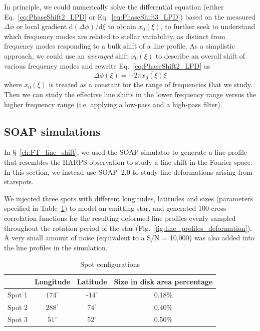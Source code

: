 In principle, we could numerically solve the differential equation (either Eq.~\ref{eq:PhaseShift2_LPD} or Eq.~\ref{eq:PhaseShift3_LPD}) based on the measured $\Delta \phi$ or local gradient d$(\Delta \phi)$/d$\xi$ to obtain $x_0(\xi)$, to further seek to understand which frequency modes are related to stellar variability, as distinct from frequency modes responding to a bulk shift of a line profile. As a simplistic approach, we could use an \textit{averaged} shift $\overline{x_0(\xi)}$ to describe an overall shift of various frequency modes and rewrite Eq.~\ref{eq:PhaseShift2_LPD} as 
\begin{equation}
	\Delta \phi(\xi) = -2 \pi \overline{x_0(\xi)} \xi
\end{equation}
where $\overline{x_0(\xi)}$ is treated as a constant for the range of frequencies that we study. Then we can study the effective line shifts in the lower frequency range versus the higher frequency range (i.e. applying a low-pass and a high-pass filter). 


\subsection{SOAP simulations}
\label{sec:Simulations}

In \S~\ref{ch:FT_line_shift}, we used the SOAP simulator to generate a line profile that resembles the HARPS observation to study a line shift in the Fourier space. In this section, we instead use SOAP~2.0 to study line deformations arising from starspots. 

We injected three spots with different longitudes, latitudes and sizes (parameters specified in Table~\ref{table:spot_configurations}) to model an emitting star, and generated 100 cross-correlation functions for the resulting  deformed line profiles evenly sampled throughout the rotation period of the star (Fig.~\ref{fig:line_profiles_deformation}). A very small amount of noise (equivalent to a S/N = 10,000) was also added into the line profiles in the simulation. 

\begin{table}[htbp]
\centering
\begin{tabular}{|c|c|c|c|}
\hline 
 & Longitude & Latitude & Size in disk area percentage\\ 
\hline 
Spot 1 & $174^\circ$ & -$14^\circ$ & 0.18\% \\ 
\hline 
Spot 2 & $288^\circ$ & $74^\circ$  & 0.40\% \\ 
\hline 
Spot 3 & $51^\circ$  & $52^\circ$  & 0.50\% \\ 
\hline 
\end{tabular} 
\caption{Spot configurations}
\label{table:spot_configurations}
\end{table}

